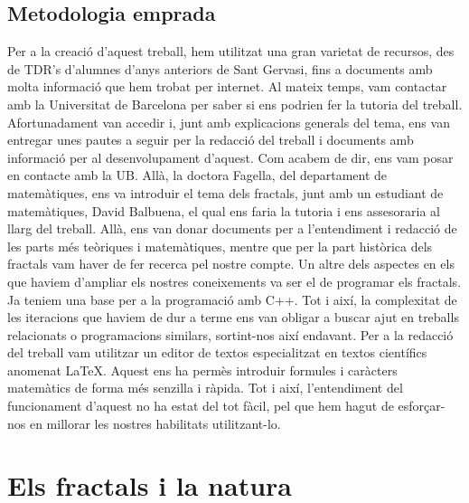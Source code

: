 \documentclass[12pt]{report}
\begin{document}
\section{Metodologia emprada}
Per a la creació d'aquest treball, hem utilitzat una gran varietat de recursos, des de TDR's d'alumnes d'anys anteriors de Sant Gervasi, fins a documents amb molta informació que hem trobat per internet. Al mateix temps, vam contactar amb la Universitat de Barcelona per saber si ens podrien fer la tutoria del treball. Afortunadament van accedir i, junt amb explicacions generals del tema, ens van entregar unes pautes a seguir per la redacció del treball i documents amb informació per al desenvolupament d'aquest. 
\newline
Com acabem de dir, ens vam posar en contacte amb la UB. Allà, la doctora Fagella, del departament de matemàtiques, ens va introduir el tema dels fractals, junt amb un estudiant de matemàtiques, David Balbuena, el qual ens faria la tutoria i ens assesoraria al llarg del treball. Allà, ens van donar documents per a l'entendiment i redacció de les parts més teòriques i matemàtiques, mentre que per la part històrica dels fractals vam haver de fer recerca pel nostre compte. 
\newline
Un altre dels aspectes en els que haviem d'ampliar els nostres coneixements va ser el de programar els fractals. Ja teniem una base per a la programació amb C++. Tot i així, la complexitat de les iteracions que haviem de dur a terme ens van obligar a buscar ajut en treballs relacionats o programacions similars, sortint-nos així endavant.
\newline
Per a la redacció del treball vam utilitzar un editor de textos especialitzat en textos científics anomenat LaTeX. Aquest ens ha permès introduir formules i caràcters matemàtics de forma més senzilla i ràpida. Tot i així, l'entendiment del funcionament d'aquest no ha estat del tot fàcil, pel que hem hagut de esforçar-nos en millorar les nostres habilitats utilitzant-lo.
\newpage
\chapter{Els fractals i la natura}
\end{document}
